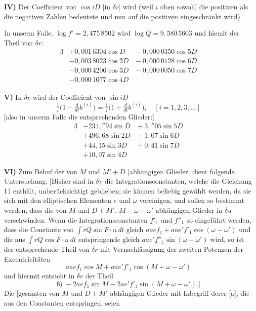\documentclass[12pt,a4paper]{article}
\begin{document}
\medskip\noindent
\textbf{IV)} Der Coefficient von $\cos iD$ [in $\delta r$] wird (weil $i$ oben sowohl die positiven als die negativen Zahlen bedeutete und nun auf die positiven eingeschränkt wird)

\newpage
\setcounter{page}{402}
%
In unserm Falle, $\log f' = 2{,}475\,8502$ wird $\log Q = 9{,}580\,5603$ und hiemit der Theil von $\delta r$:
\begin{alignat*}{3}
&+ 0{,}001\,6304\cos D &{}- 0{,}000\,0350\cos 5D\\
&- 0{,}003\,8023\cos 2D &{}- 0{,}000\,0128\cos 6D\\
&- 0{,}000\,4206\cos 3D &{}- 0{,}000\,0050\cos 7D\\
&- 0{,}000\,1077\cos 4D
\end{alignat*}

\medskip\noindent
\textbf{V)} In $\delta v$ wird der Coefficient von $\sin iD$
\[\tfrac{1}{i}\bigl(1 - \tfrac{d}{dt} b^{(i)}\bigr) = \tfrac{1}{i}\bigl(1 + \tfrac{d}{dt} b^{(i)}\bigr),\quad [i = 1, 2, 3, \ldots]\]
[also in unserm Falle die entsprechenden Glieder:]
\begin{alignat*}{3}
&- 231{,}''94 \sin D &{}+ 3{,}''05 \sin 5D\\
&+ 496{,}68 \sin 2D &{}+ 1{,}07 \sin 6D\\
&+ 44{,}15 \sin 3D &{}+ 0{,}41 \sin 7D\\
&+ 10{,}07 \sin 4D
\end{alignat*}

\medskip\noindent
\textbf{VI)} Zum Behuf der von $M$ und $M' + D$ [abhängigen Glieder] dient folgende Untersuchung. [Bisher sind in $\delta v$ die Integrationsconstanten, welche die Gleichung 11 enthält, unberücksichtigt geblieben; sie können beliebig gewählt werden, da sie sich mit den elliptischen Elementen $e$ und $\omega$ vereinigen, und sollen so bestimmt werden, dass die von $M$ und $D + M'$, $M - \omega - \omega'$ abhängigen Glieder in $\delta u$ verschwinden. Wenn die Integrationsconstanten $f'_1$ und $f''_1$ so eingeführt werden, dass die Constante von $\int rQ \sin F \cdot n\,dt$ gleich $aaef_1 + aae'f'_1 \cos(\omega - \omega')$ und die aus $\int rQ \cos F \cdot n\,dt$ entspringende gleich $aae'f''_1 \sin(\omega - \omega')$ wird, so ist der entsprechende Theil von $\delta r$ mit Vernachlässigung der zweiten Potenzen der Excentricitäten
\[aaef_1 \cos M + aae'f'_1 \cos(M + \omega - \omega')\]
und hiermit entsteht in $\delta v$ der Theil
\[\text{ß)}\; -2aef_1 \sin M - 2ae'f'_1 \sin(M + \omega - \omega').\text{]}\]
Die [gesamten von $M$ und $D + M'$ abhängigen Glieder mit Inbegriff derer [a], die aus den Constanten entspringen, seien
\end{document}
